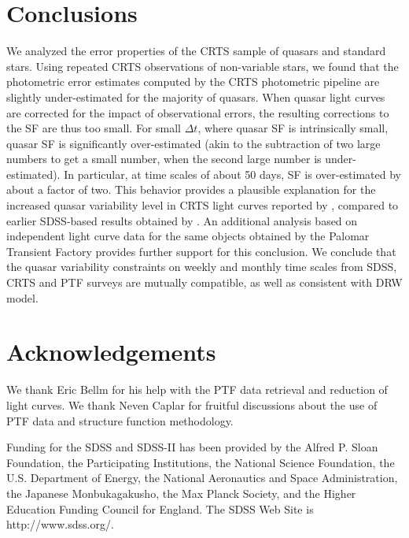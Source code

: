 \documentclass[fleqn,usenatbib]{mnras}  %
\begin{document}
\section{Conclusions}

We analyzed the error properties of the CRTS sample of quasars and standard stars. Using 
repeated CRTS observations of non-variable stars, we found that the photometric error estimates 
computed by the CRTS photometric pipeline are slightly under-estimated for the majority of
quasars. When quasar light curves are corrected for the impact of observational errors, the
resulting corrections to the SF are thus too small. For small $\Delta t$, where quasar SF is intrinsically 
small, quasar SF is significantly over-estimated (akin to the subtraction of two large numbers 
to get a small number, when the second large number is under-estimated). In particular, at time
scales of about 50 days, SF is over-estimated by about a factor of two. This behavior provides 
a plausible explanation for the increased quasar variability level in CRTS light curves reported 
by \cite{graham2014}, compared to earlier SDSS-based results obtained by \cite{macleod2010}.
An additional analysis based on independent light curve data for the same objects obtained by 
the Palomar Transient Factory provides further support for this conclusion. We conclude that
the quasar variability constraints on weekly and monthly time scales from SDSS, CRTS and PTF 
surveys are mutually compatible, as well as consistent with DRW model. 



\section*{Acknowledgements}

We thank Eric Bellm for his help with the PTF data retrieval and reduction of light curves.  
We thank Neven Caplar for fruitful discussions about the use of PTF data and structure 
function methodology. 

Funding for the SDSS and SDSS-II has been provided by the Alfred P. Sloan Foundation, 
the Participating Institutions, the National Science Foundation, the U.S. Department of 
Energy, the National Aeronautics and Space Administration, the Japanese Monbukagakusho,
the Max Planck Society, and the Higher Education Funding Council for England. The SDSS 
Web Site is http://www.sdss.org/.
\end{document}
